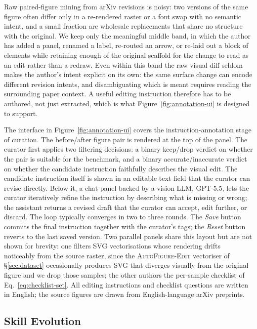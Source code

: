 \documentclass[11pt]{article}
\begin{document}
Raw paired-figure mining from arXiv revisions is noisy: two
versions of the same figure often differ only in a re-rendered
raster or a font swap with no semantic intent, and a small
fraction are wholesale replacements that share no structure
with the original.  We keep only the meaningful middle band,
in which the author has added a panel, renamed a label,
re-routed an arrow, or re-laid out a block of elements while
retaining enough of the original scaffold for the change to
read as an edit rather than a redraw.  Even within this band
the raw visual diff seldom makes the author's intent
explicit on its own: the same surface change can encode
different revision intents, and disambiguating which is meant
requires reading the surrounding paper context.  A useful
editing instruction therefore has to be authored, not just
extracted, which is what Figure~\ref{fig:annotation-ui} is
designed to support.

The interface in Figure~\ref{fig:annotation-ui} covers the
instruction-annotation stage of curation.  The before/after
figure pair is rendered at the top of the panel.  The curator
first applies two filtering decisions: a binary keep/drop
verdict on whether the pair is suitable for the benchmark,
and a binary accurate/inaccurate verdict on whether the
candidate instruction faithfully describes the visual edit.
The candidate instruction itself is shown in an editable text
field that the curator can revise directly.  Below it, a chat
panel backed by a vision LLM, \textsc{GPT-5.5}, lets
the curator iteratively refine the instruction by describing
what is missing or wrong; the assistant returns a revised
draft that the curator can accept, edit further, or discard.
The loop typically converges in two to three rounds.  The
\emph{Save} button commits the final instruction together
with the curator's tags; the \emph{Reset} button reverts to
the last saved version.  Two parallel panels share this layout but are not shown for
brevity: one filters SVG vectorisations whose rendering
drifts noticeably from the source raster, since the
\textsc{AutoFigure-Edit} vectoriser of \S\ref{sec:dataset}
occasionally produces SVG that diverges visually from the
original figure and we drop those samples; the other
authors the per-sample checklist of
Eq.~\ref{eq:checklist-set}.  All editing instructions and
checklist questions are written in English; the source
figures are drawn from English-language arXiv preprints.

\subsection{Skill Evolution}
\label{sec:appendix-settings}
\end{document}

